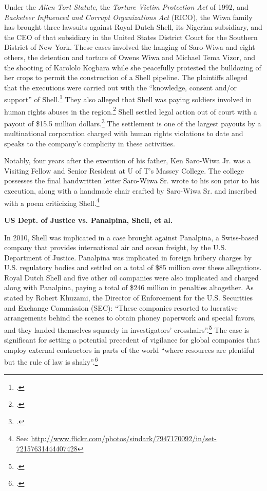 \documentclass[10pt]{article}
\begin{document}
Under the \emph{Alien Tort Statute}, the \emph{Torture Victim Protection Act} of 1992, and \emph{Racketeer Influenced and Corrupt Organizations Act} (RICO), the Wiwa family has brought three lawsuits against Royal Dutch Shell, its Nigerian subsidiary, and the CEO of that subsidiary in the United States District Court for the Southern District of New York.
These cases involved the hanging of Saro-Wiwa and eight others, the detention and torture of Owens Wiwa and Michael Tema Vizor, and the shooting of Karololo Kogbara while she peacefully protested the bulldozing of her crops to permit the construction of a Shell pipeline.
The plaintiffs alleged that the executions were carried out with the ``knowledge, consent and/or support'' of Shell.\footcite{ShellTrialDelayed}
They also alleged that Shell was paying soldiers involved in human rights abuses in the region.\footcite{Shell15Million}
Shell settled legal action out of court with a payout of \$15.5 million dollars.\footcite{Shell15Million}
The settlement is one of the largest payouts by a multinational corporation charged with human rights violations to date and speaks to the company's complicity in these activities.



Notably, four years after the execution of his father, Ken Saro-Wiwa Jr. was a Visiting Fellow and Senior Resident at U of T's Massey College.
The college possesses the final handwritten letter Saro-Wiwa Sr. wrote to his son prior to his execution, along with a handmade chair crafted by Saro-Wiwa Sr. and inscribed with a poem criticizing Shell.\footnote{See: \url{http://www.flickr.com/photos/sindark/7947170092/in/set-72157631444407428}}



\textbf{US Dept. of Justice vs. Panalpina, Shell, et al.}



In 2010, Shell was implicated in a case brought against Panalpina, a Swiss-based company that provides international air and ocean freight, by the U.S. Department of Justice. 
Panalpina was implicated in foreign bribery charges by U.S. regulatory bodies and settled on a total of \$85 million over these allegations. 
Royal Dutch Shell and five other oil companies were also implicated and charged along with Panalpina, paying a total of \$246 million in penalties altogether. 
As stated by Robert Khuzami, the Director of Enforcement for the U.S. Securities and Exchange Commission (SEC): ``These companies resorted to lucrative arrangements behind the scenes to obtain phoney paperwork and special favors, and they landed themselves squarely in investigators’ crosshairs''.\footcite[][p. 119]{KochanGoodYear_2011} 
The case is significant for setting a potential precedent of vigilance for global companies that employ external contractors in parts of the world ``where resources are plentiful but the rule of law is shaky''.\footcite[][]{Bribery_2010}
\end{document}
